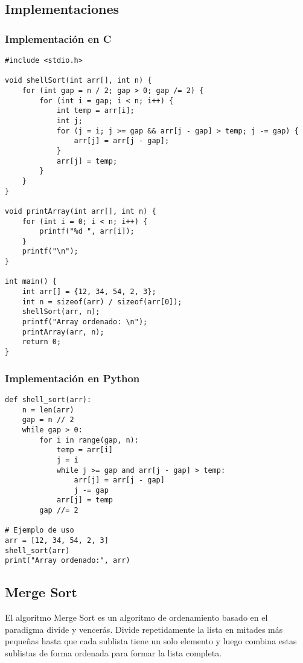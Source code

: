 \documentclass[11pt,openany]{book}
\begin{document}
\subsection{Implementaciones}

\subsubsection{Implementación en C}
\lstset{language=C}
\begin{lstlisting}
#include <stdio.h>

void shellSort(int arr[], int n) {
    for (int gap = n / 2; gap > 0; gap /= 2) {
        for (int i = gap; i < n; i++) {
            int temp = arr[i];
            int j;
            for (j = i; j >= gap && arr[j - gap] > temp; j -= gap) {
                arr[j] = arr[j - gap];
            }
            arr[j] = temp;
        }
    }
}

void printArray(int arr[], int n) {
    for (int i = 0; i < n; i++) {
        printf("%d ", arr[i]);
    }
    printf("\n");
}

int main() {
    int arr[] = {12, 34, 54, 2, 3};
    int n = sizeof(arr) / sizeof(arr[0]);
    shellSort(arr, n);
    printf("Array ordenado: \n");
    printArray(arr, n);
    return 0;
}
\end{lstlisting}

\subsubsection{Implementación en Python}
\lstset{language=Python}
\begin{lstlisting}
def shell_sort(arr):
    n = len(arr)
    gap = n // 2
    while gap > 0:
        for i in range(gap, n):
            temp = arr[i]
            j = i
            while j >= gap and arr[j - gap] > temp:
                arr[j] = arr[j - gap]
                j -= gap
            arr[j] = temp
        gap //= 2

# Ejemplo de uso
arr = [12, 34, 54, 2, 3]
shell_sort(arr)
print("Array ordenado:", arr)
\end{lstlisting}


\subsection{Merge Sort}
El algoritmo Merge Sort es un algoritmo de ordenamiento basado en el paradigma divide y vencerás. Divide repetidamente la lista en mitades más pequeñas hasta que cada sublista tiene un solo elemento y luego combina estas sublistas de forma ordenada para formar la lista completa.
\end{document}
